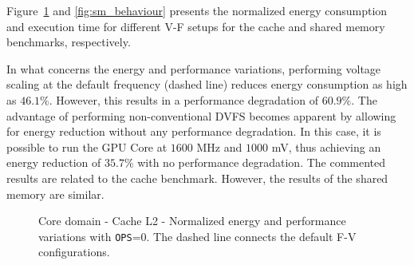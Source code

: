 Figure~\ref{fig:cache_behaviour} and \ref{fig:sm_behaviour} presents the normalized energy consumption and execution time for different V-F setups for the cache and shared memory benchmarks, respectively.  

In what concerns the energy and performance variations, performing voltage scaling at the default frequency (dashed line) reduces energy consumption as high as $46.1\% $. However, this results in a performance degradation of $60.9\%$. The advantage of performing non-conventional DVFS becomes apparent by allowing for energy reduction without any performance degradation. In this case, it is possible to run the GPU Core at $1600$ MHz and $1000$ mV, thus achieving an energy reduction of $35.7\%$ with no performance degradation. The commented results are related to the cache benchmark. However, the results of the shared memory are similar.

\begin{figure}[!htb]
    \centering
    \begin{subfigmatrix}{2}
      \label{fig:cache_behaviour}
    \end{subfigmatrix}
    \caption{Core domain - Cache L2 - Normalized energy and performance variations with \texttt{OPS}=0. The dashed line connects the default F-V configurations.}
\end{figure}

